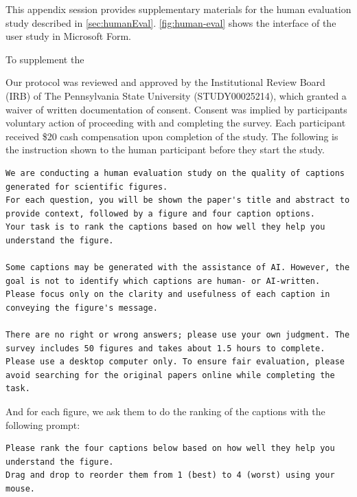 This appendix session provides supplementary materials for the human evaluation study described in \autoref{sec:humanEval}. \autoref{fig:human-eval} shows the interface of the user study in Microsoft Form. 

To supplement the 

Our protocol was reviewed and approved by the Institutional Review Board (IRB) of The Pennsylvania State University (STUDY00025214), which granted a waiver of written documentation of consent. Consent was implied by participants voluntary action of proceeding with and completing the survey.
Each participant received \$20 cash compensation upon completion of the study. The following is the instruction shown to the human participant before they start the study.

\begin{lstlisting}[basicstyle=\small\ttfamily, breaklines=true, frame=single]
We are conducting a human evaluation study on the quality of captions generated for scientific figures.
For each question, you will be shown the paper's title and abstract to provide context, followed by a figure and four caption options.
Your task is to rank the captions based on how well they help you understand the figure.

Some captions may be generated with the assistance of AI. However, the goal is not to identify which captions are human- or AI-written. Please focus only on the clarity and usefulness of each caption in conveying the figure's message.

There are no right or wrong answers; please use your own judgment. The survey includes 50 figures and takes about 1.5 hours to complete. Please use a desktop computer only. To ensure fair evaluation, please avoid searching for the original papers online while completing the task.
\end{lstlisting}

And for each figure, we ask them to do the ranking of the captions with the following prompt:
\begin{lstlisting}[basicstyle=\small\ttfamily, breaklines=true, frame=single]
Please rank the four captions below based on how well they help you understand the figure.
Drag and drop to reorder them from 1 (best) to 4 (worst) using your mouse.
\end{lstlisting}

%
